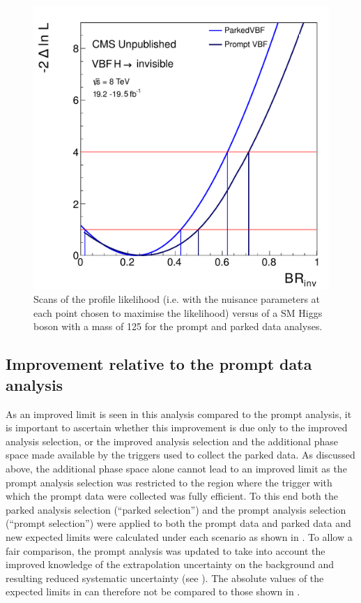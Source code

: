 \begin{figure}
  \includegraphics[width=\largefigwidth]{plots/parked/promptparkedscan.pdf}
  \caption{Scans of the profile likelihood (i.e. with the nuisance parameters at each point chosen to maximise the likelihood) versus \BRinv of a SM Higgs boson with a mass of 125 \GeV for the prompt and parked data analyses.}
  \label{fig:parkedlikelihood}
\end{figure}

\subsection{Improvement relative to the prompt data analysis}
As an improved limit is seen in this analysis compared to the prompt analysis, it is important to ascertain whether this improvement is due only to the improved analysis selection, or the improved analysis selection and the additional phase space made available by the triggers used to collect the parked data. As discussed above, the additional phase space alone cannot lead to an improved limit as the prompt analysis selection was restricted to the region where the trigger with which the prompt data were collected was fully efficient. To this end both the parked analysis selection (``parked selection'') and the prompt analysis selection (``prompt selection'') were applied to both the prompt data and parked data and new expected limits were calculated under each scenario as shown in . To allow a fair comparison, the prompt analysis was updated to take into account the improved knowledge of the extrapolation uncertainty on the \Znunu background and resulting reduced systematic uncertainty (see ). The absolute values of the expected limits in  can therefore not be compared to those shown in .

